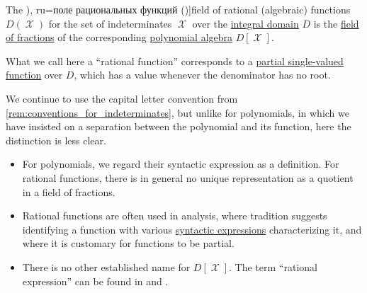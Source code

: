 \begin{definition}\label{def:rational_function_field}
  The \term[bg=поле на рационалните функции (\cite[360]{ГеновМиховскиМоллов1991Алгебра}), ru=поле рациональных функций (\cite[18]{Шафаревич2019ОсновныеПонятияАлгебры})]{field of rational (algebraic) functions} \( D(\mscrX) \) for the set of indeterminates \( \mscrX \) over the \hyperref[def:integral_domain]{integral domain} \( D \) is the \hyperref[def:field_of_fractions]{field of fractions} of the corresponding \hyperref[def:polynomial_algebra]{polynomial algebra} \( D[\mscrX] \).
\end{definition}
\begin{comments}
  \item What we call here a \enquote{rational function} corresponds to a \hyperref[def:partial_function]{partial single-valued function} over \( D \), which has a value whenever the denominator has no root.

  We continue to use the capital letter convention from \cref{rem:conventions_for_indeterminates}, but unlike for polynomials, in which we have insisted on a separation between the polynomial and its function, here the distinction is less clear.
  \begin{itemize}
    \item For polynomials, we regard their syntactic expression as a definition. For rational functions, there is in general no unique representation as a quotient in a field of fractions.

    \item Rational functions are often used in analysis, where tradition suggests identifying a function with various \hyperref[con:expression]{syntactic expressions} characterizing it, and where it is customary for functions to be partial.

    \item There is no other established name for \( D[\mscrX] \). The term \enquote{rational expression} can be found in \cite[232]{Jacobson1985BasicAlgebraI} and \cite[384]{Knapp2016BasicAlgebra}.
  \end{itemize}
\end{comments}

